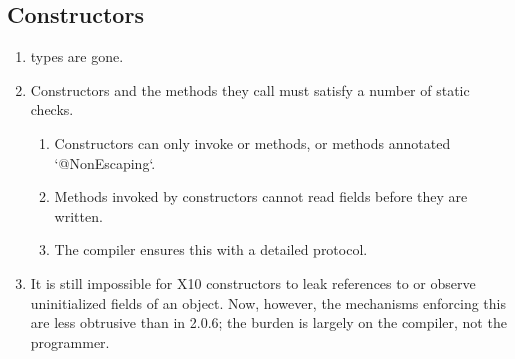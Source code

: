 \subsection{Constructors}


\begin{enumerate}
\item {} types are gone.
\item Constructors and the methods they call must satisfy a number of static
      checks.  
    
    \begin{enumerate}
    \item Constructors can only invoke  or  methods, 
          or methods annotated \xcd`@NonEscaping`.  
    \item Methods invoked by constructors cannot read fields before they are
          written. 
    \item The compiler ensures this with a detailed protocol. 
    \end{enumerate}

\item It is still impossible for X10 constructors to leak references to
       or observe uninitialized fields of an object.  Now, however,
      the mechanisms enforcing this are less obtrusive than in 2.0.6; the
      burden is largely on the compiler, not the programmer.
\end{enumerate}




